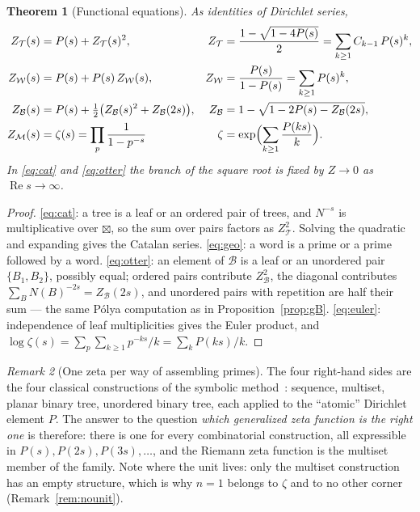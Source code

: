 \documentclass[11pt]{article}
\newcommand{\cT}{\mathcal{T}}   %
\newcommand{\cW}{\mathcal{W}}   %
\newcommand{\cB}{\mathcal{B}}   %
\newcommand{\cM}{\mathcal{M}}   %
\numberwithin{equation}{section}
\theoremstyle{plain}
\newtheorem{theorem}{Theorem}[section]
\theoremstyle{definition}
\theoremstyle{remark}
\newtheorem{remark}[theorem]{Remark}
\begin{document}
\begin{theorem}[Functional equations]\label{thm:funceq}
As identities of Dirichlet series,
\begin{align}
Z_\cT(s) &= P(s) + Z_\cT(s)^2,
& Z_\cT &= \frac{1 - \sqrt{1 - 4P(s)}}{2} = \sum_{k\ge1} C_{k-1}\,P(s)^k,
\label{eq:cat}\\
Z_\cW(s) &= P(s) + P(s)\,Z_\cW(s),
& Z_\cW &= \frac{P(s)}{1-P(s)} = \sum_{k \ge 1} P(s)^k,
\label{eq:geo}\\
Z_\cB(s) &= P(s) + \tfrac12\bigl(Z_\cB(s)^2 + Z_\cB(2s)\bigr),
& Z_\cB &= 1 - \sqrt{1 - 2P(s) - Z_\cB(2s)},
\label{eq:otter}\\
Z_\cM(s) &= \zeta(s) = \prod_p \frac{1}{1-p^{-s}}
& \zeta &= \exp\Bigl(\sum_{k \ge 1} \frac{P(ks)}{k}\Bigr).
\label{eq:euler}
\end{align}
In \eqref{eq:cat} and \eqref{eq:otter} the branch of the square root is fixed by
$Z \to 0$ as $\operatorname{Re} s \to \infty$.
\end{theorem}

\begin{proof}
\eqref{eq:cat}: a tree is a leaf or an ordered pair of trees, and $N^{-s}$ is
multiplicative over $\boxtimes$, so the sum over pairs factors as $Z_\cT^2$. Solving the
quadratic and expanding gives the Catalan series.
\eqref{eq:geo}: a word is a prime or a prime followed by a word.
\eqref{eq:otter}: an element of $\cB$ is a leaf or an unordered pair
$\{B_1,B_2\}$, possibly equal; ordered pairs contribute $Z_\cB^2$, the diagonal
contributes $\sum_B N(B)^{-2s} = Z_\cB(2s)$, and unordered pairs with repetition are
half their sum --- the same P\'olya computation as in Proposition~\ref{prop:gB}.
\eqref{eq:euler}: independence of leaf multiplicities gives the Euler product, and
$\log \zeta(s) = \sum_p \sum_{k\ge1} p^{-ks}/k = \sum_k P(ks)/k$.
\end{proof}

\begin{remark}[One zeta per way of assembling primes]\label{rem:species}
The four right-hand sides are the four classical constructions of the symbolic
method~\cite{flajolet}: sequence, multiset, planar binary tree, unordered binary tree,
each applied to the ``atomic'' Dirichlet element $P$. The answer to the question
\emph{which generalized zeta function is the right one} is therefore: there is one for
every combinatorial construction, all expressible in $P(s), P(2s), P(3s), \dots$, and
the Riemann zeta function is the multiset member of the family. Note where the unit
lives: only the multiset construction has an empty structure, which is why $n=1$ belongs
to $\zeta$ and to no other corner (Remark~\ref{rem:nounit}).
\end{remark}
\end{document}
